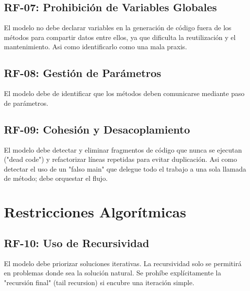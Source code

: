 \subsection{RF-07: Prohibición de Variables Globales}{
El modelo no debe declarar variables en la generación de código fuera de los métodos para compartir datos entre ellos, ya que dificulta la reutilización y el mantenimiento. Asi como identificarlo como una mala praxis.
}

\subsection{RF-08: Gestión de Parámetros}{
El modelo debe de identificar que los métodos deben comunicarse mediante paso de parámetros.
}

\subsection{RF-09: Cohesión y Desacoplamiento}{
El modelo debe detectar y eliminar fragmentos de código que nunca se ejecutan ("dead code") y refactorizar líneas repetidas para evitar duplicación. Asi como detectar el uso de un "falso main" que delegue todo el trabajo a una sola llamada de método; debe orquestar el flujo.
}

\section{Restricciones Algorítmicas}

\subsection{RF-10: Uso de Recursividad}
El modelo debe priorizar soluciones iterativas. La recursividad solo se permitirá en problemas donde sea la solución natural. Se prohíbe explícitamente la "recursión final" (tail recursion) si encubre una iteración simple.